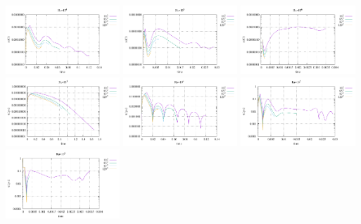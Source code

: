 \begin{center}
\includegraphics[width=4.297cm]{python_codes/fieldstone_155/results/conv_T_Ra1e4}
\includegraphics[width=4.297cm]{python_codes/fieldstone_155/results/conv_T_Ra1e5}
\includegraphics[width=4.297cm]{python_codes/fieldstone_155/results/conv_T_Ra1e6}\\
\includegraphics[width=4.297cm]{python_codes/fieldstone_155/results/conv_psi_Ra1e3}
\includegraphics[width=4.297cm]{python_codes/fieldstone_155/results/conv_psi_Ra1e4}
\includegraphics[width=4.297cm]{python_codes/fieldstone_155/results/conv_psi_Ra1e5}
\includegraphics[width=4.297cm]{python_codes/fieldstone_155/results/conv_psi_Ra1e6}\\

\end{center}
